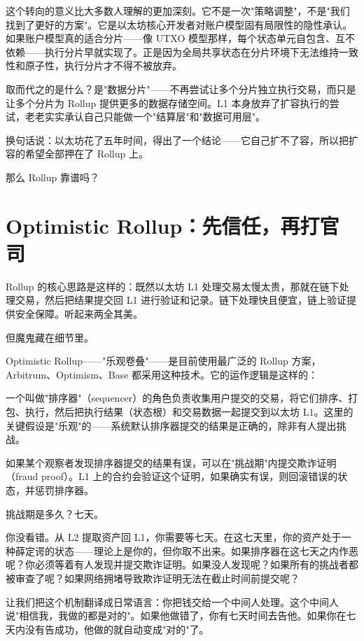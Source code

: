 \documentclass[a4paper,12pt,openany]{ctexbook}
\begin{document}
这个转向的意义比大多数人理解的更加深刻。它不是一次"策略调整"，不是"我们找到了更好的方案"。它是以太坊核心开发者对账户模型固有局限性的隐性承认。如果账户模型真的适合分片——像 UTXO 模型那样，每个状态单元自包含、互不依赖——执行分片早就实现了。正是因为全局共享状态在分片环境下无法维持一致性和原子性，执行分片才不得不被放弃。

取而代之的是什么？是"数据分片"——不再尝试让多个分片独立执行交易，而只是让多个分片为 Rollup 提供更多的数据存储空间。L1 本身放弃了扩容执行的尝试，老老实实承认自己只能做一个"结算层"和"数据可用层"。

换句话说：以太坊花了五年时间，得出了一个结论——它自己扩不了容，所以把扩容的希望全部押在了 Rollup 上。

那么 Rollup 靠谱吗？


\section*{Optimistic Rollup：先信任，再打官司}


Rollup 的核心思路是这样的：既然以太坊 L1 处理交易太慢太贵，那就在链下处理交易，然后把结果提交回 L1 进行验证和记录。链下处理快且便宜，链上验证提供安全保障。听起来两全其美。

但魔鬼藏在细节里。

Optimistic Rollup——"乐观卷叠"——是目前使用最广泛的 Rollup 方案，Arbitrum、Optimism、Base 都采用这种技术。它的运作逻辑是这样的：

一个叫做"排序器"（sequencer）的角色负责收集用户提交的交易，将它们排序、打包、执行，然后把执行结果（状态根）和交易数据一起提交到以太坊 L1。这里的关键假设是"乐观"的——系统默认排序器提交的结果是正确的，除非有人提出挑战。

如果某个观察者发现排序器提交的结果有误，可以在"挑战期"内提交欺诈证明（fraud proof）。L1 上的合约会验证这个证明，如果确实有误，则回滚错误的状态，并惩罚排序器。

挑战期是多久？七天。

你没看错。从 L2 提取资产回 L1，你需要等七天。在这七天里，你的资产处于一种薛定谔的状态——理论上是你的，但你取不出来。如果排序器在这七天之内作恶呢？你必须等着有人发现并提交欺诈证明。如果没人发现呢？如果所有的挑战者都被审查了呢？如果网络拥堵导致欺诈证明无法在截止时间前提交呢？

让我们把这个机制翻译成日常语言：你把钱交给一个中间人处理。这个中间人说"相信我，我做的都是对的"。如果他做错了，你有七天时间去告他。如果你在七天内没有告成功，他做的就自动变成"对的"了。
\end{document}
